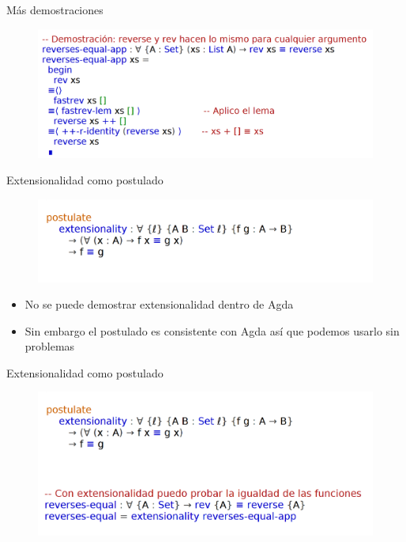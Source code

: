 \documentclass[11pt]{beamer}
\newcommand{\bit}{\begin{itemize}\setlength\itemsep{1em}}
\newcommand{\eit}{\end{itemize}}
\begin{document}
\begin{frame}{Más demostraciones}
\begin{figure}
\includegraphics[scale=0.55]{img/rev-thm}
\end{figure}
\end{frame}


\begin{frame}{Extensionalidad como postulado}
\begin{figure}
\includegraphics[scale=0.6]{img/extensionality}
\end{figure}
\bit
\item No se puede demostrar extensionalidad dentro de Agda
\item Sin embargo el postulado es consistente con Agda así que podemos usarlo sin problemas
\eit
\end{frame}


\begin{frame}{Extensionalidad como postulado}
\begin{figure}
\includegraphics[scale=0.6]{img/extensionality02}
\end{figure}
\end{frame}
\end{document}
